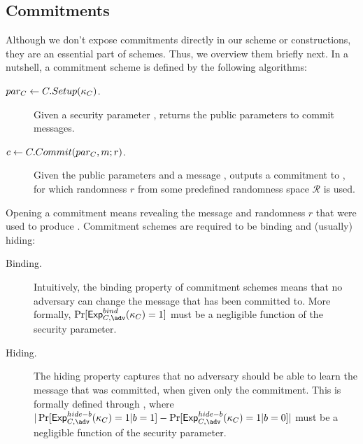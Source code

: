 \subsection{Commitments}
\label{sapp:commitments}

Although we don't expose commitments directly in our \UAS scheme or
constructions, they are an essential part of \SBCM schemes. Thus, we overview
them briefly next. In a nutshell, a commitment scheme is defined by the
following algorithms:

\begin{description}
\item[$par_C \gets C.Setup(\kappa_{C})$.] Given a security parameter \Csecpar,
  returns the public parameters \Cparm to commit messages.
\item[$c \gets C.Commit(par_C,m;r)$.] Given the public parameters and
  a message \msg, outputs a commitment \Ccom to \msg, for which randomness $r$
  from some predefined randomness space $\mathcal{R}$ is used.
\end{description}

Opening a commitment \Ccom means revealing the message \msg and randomness $r$
that were used to produce \Ccom. Commitment schemes are required to be binding
and (usually) hiding:

\begin{description}
\item[Binding.] Intuitively, the binding property of commitment schemes means
  that no adversary can change the message that has been committed to. More
  formally, $\Pr[\ExpComBind(\Csecpar) = 1]$ must be a negligible function of
  the security parameter.
\item[Hiding.] The hiding property captures that no adversary should be able to
  learn the message that was committed, when given only the commitment. This is
  formally defined through \ExpComHideb, where $|\Pr[\ExpComHideb(\Csecpar)=1|
  b=1] - \Pr[\ExpComHideb(\Csecpar)=1|b=0]|$ must be a negligible function of
  the security parameter.
\end{description}

